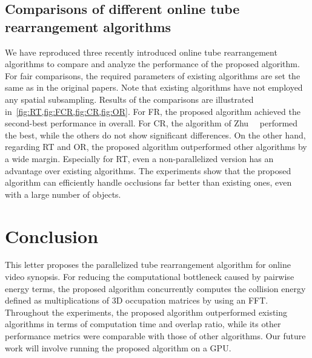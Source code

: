 \documentclass[11pt]{hyu_thesis}
\begin{document}
\subsection{Comparisons of different online tube rearrangement algorithms}
We have reproduced three recently introduced online tube rearrangement algorithms to compare and analyze the performance of the proposed algorithm. For fair comparisons, the required parameters of existing algorithms are set the same as in the original papers. Note that existing algorithms have not employed any spatial subsampling. Results of the comparisons are illustrated in~\cref{fig:RT,fig:FCR,fig:CR,fig:OR}. For FR, the proposed algorithm achieved the second-best performance in overall. For CR, the algorithm of Zhu~\etal~\cite{JianqingZhu2015} performed the best, while the others do not show significant differences. On the other hand, regarding RT and OR, the proposed algorithm outperformed other algorithms by a wide margin. Especially for RT, even a non-parallelized version has an advantage over existing algorithms. The experiments show that the proposed algorithm can efficiently handle occlusions far better than existing ones, even with a large number of objects.

\section{Conclusion}
\label{sec:conc}
This letter proposes the parallelized tube rearrangement algorithm for online video synopsis. For reducing the computational bottleneck caused by pairwise energy terms, the proposed algorithm concurrently computes the collision energy defined as multiplications of 3D occupation matrices by using an FFT. Throughout the experiments, the proposed algorithm outperformed existing algorithms in terms of computation time and overlap ratio, while its other performance metrics were comparable with those of other algorithms. Our future work will involve running the proposed algorithm on a GPU.



\end{document}
